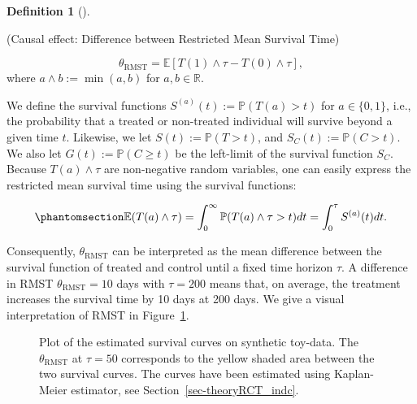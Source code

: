 \documentclass[
  11pt,
  a4paper,
]{article}
\theoremstyle{plain}
\theoremstyle{plain}
\theoremstyle{plain}
\theoremstyle{definition}
\newtheorem{definition}{Definition}[section]
\theoremstyle{remark}
\begin{document}
\begin{definition}[]\protect\hypertarget{def-ATE}{}\label{def-ATE}

(Causal effect: Difference between Restricted Mean Survival Time)

\[
\theta_{\mathrm{RMST}} = \mathbb{E}\left[T(1) \wedge \tau - T(0) \wedge \tau\right], 
\] where \(a \wedge b := \min(a,b)\) for \(a,b \in \mathbb{R}\).

\end{definition}

We define the survival functions \(S^{(a)}(t):=\mathbb{P}(T(a) > t)\)
for \(a \in \{0,1\}\), i.e., the probability that a treated or
non-treated individual will survive beyond a given time \(t\). Likewise,
we let \(S(t) := \mathbb{P}(T >t)\), and
\(S_C(t) := \mathbb{P}(C > t)\). We also let
\(G(t) := \mathbb{P}(C \geqslant t)\) be the left-limit of the survival
function \(S_C\). Because \(T(a) \wedge \tau\) are non-negative random
variables, one can easily express the restricted mean survival time
using the survival functions:

\begin{equation}\phantomsection\label{eq-rmstsurv}{
\mathbb{E}(T(a) \wedge \tau) = \int_{0}^{\infty} \mathbb{P}(T(a)\wedge \tau > t)dt = \int_{0}^{\tau}S^{(a)}(t)dt.
}\end{equation}

Consequently, \(\theta_{\mathrm{RMST}}\) can be interpreted as the mean
difference between the survival function of treated and control until a
fixed time horizon \(\tau\). A difference in RMST
\(\theta_{\mathrm{RMST}} = 10\) days with \(\tau=200\) means that, on
average, the treatment increases the survival time by 10 days at 200
days. We give a visual interpretation of RMST in Figure~\ref{fig-RMST}.

\begin{figure}


\caption{\label{fig-RMST}Plot of the estimated survival curves on
synthetic toy-data. The \(\theta_{\mathrm{RMST}}\) at \(\tau=50\)
corresponds to the yellow shaded area between the two survival curves.
The curves have been estimated using Kaplan-Meier estimator, see
Section~\ref{sec-theoryRCT_indc}.}

\end{figure}%
\end{document}
